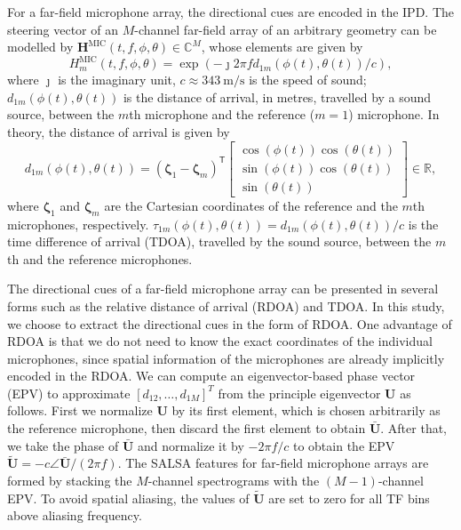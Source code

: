 \documentclass[journal]{IEEEtran}
\newcommand{\mbf}{\mathbf}
\newcommand{\T}{\mathsf{T}}
\begin{document}
For a far-field microphone array, the directional cues are encoded in the IPD. The steering vector of an $M$-channel far-field array of an arbitrary geometry can be modelled by $\mbf{H}^\text{MIC}(t, f, \phi, \theta)\in \mathbb{C}^{M}$, whose elements are given by
\begin{equation}
    H_m^\text{MIC}(t, f, \phi, \theta)
    = \exp\left(-\jmath 2\pi f d_{1m}(\phi(t), \theta(t)) / c\right),
\label{eq:mic_steervec}
\end{equation} \nobreak
where $\jmath$ is the imaginary unit, $c \approx \SI{343}{\meter\per\second}$ is the speed of sound; $d_{1m}(\phi(t), \theta(t))$ is the distance of arrival, in metres, travelled by a sound source, between the $m$th microphone and the reference ($m=1$) microphone. In theory, the distance of arrival is given by
\begin{equation}
    d_{1m}(\phi(t), \theta(t)) = (\bm{\zeta}_1 - \bm{\zeta}_m)^\T 
    \begin{bmatrix} 
        \cos(\phi(t)) \cos(\theta(t)) \\ 
        \sin(\phi(t)) \cos(\theta(t)) \\ 
        \sin(\theta(t))
    \end{bmatrix} \in \mathbb{R},
    \label{eq:dist_of_arrival}
\end{equation}
where $\bm{\zeta}_1$ and $\bm{\zeta}_m$ are the Cartesian coordinates of the reference and the $m$th microphones, respectively. $\tau_{1m}(\phi(t), \theta(t)) = d_{1m}(\phi(t), \theta(t)) / c$ is the time difference of arrival (TDOA), travelled by the sound source, between the $m$th and the reference microphones. 

The directional cues of a far-field microphone array can be presented in several forms such as the relative distance of arrival (RDOA) and TDOA. In this study, we choose to extract the directional cues in the form of RDOA. One advantage of RDOA is that we do not need to know the exact coordinates of the individual microphones, since spatial information of the microphones are already implicitly encoded in the RDOA. We can compute an eigenvector-based phase vector (EPV) to approximate $[d_{12}, \ldots, d_{1M}]^T$ from the principle eigenvector $\mathbf{U}$ as follows. First we normalize $\mathbf{U}$ by its first element, which is chosen arbitrarily as the reference microphone, then discard the first element to obtain $\mathbf{\bar{U}}$. After that, we take the phase of $\mathbf{\bar{U}}$ and normalize it by $-2\pi f/c$ to obtain the EPV $\mathbf{\widetilde{U}} =- c\angle\mathbf{\bar{U}}/(2 \pi f)$. The SALSA features for {far-field microphone arrays} are formed by stacking the $M$-channel spectrograms with the $(M-1)$-channel EPV. To avoid spatial aliasing, the values of $\mathbf{\widetilde{U}}$ are set to zero for all TF bins above aliasing frequency. 
\end{document}
